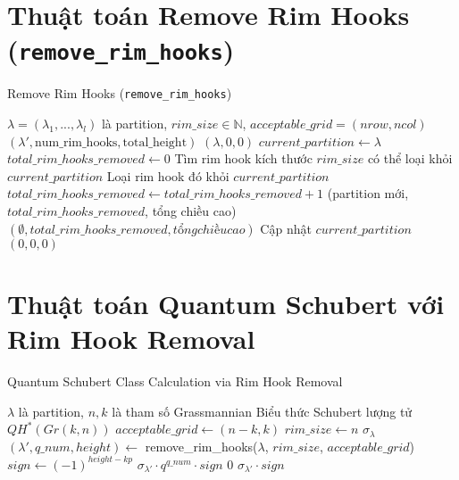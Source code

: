 \section*{Thuật toán Remove Rim Hooks (\texttt{remove\_rim\_hooks})}

\begin{algorithm}[H]
\caption{Remove Rim Hooks (\texttt{remove\_rim\_hooks})}
\begin{algorithmic}[1]
\REQUIRE $\lambda = (\lambda_1, ..., \lambda_l)$ là partition, $rim\_size \in \mathbb{N}$, $acceptable\_grid = (nrow, ncol)$
\ENSURE $(\lambda', \text{num\_rim\_hooks}, \text{total\_height})$
    \RETURN $(\lambda, 0, 0)$
\ENDIF
\STATE $current\_partition \gets \lambda$
\STATE $total\_rim\_hooks\_removed \gets 0$
    \STATE Tìm rim hook kích thước $rim\_size$ có thể loại khỏi $current\_partition$
        \STATE Loại rim hook đó khỏi $current\_partition$
        \STATE $total\_rim\_hooks\_removed \gets total\_rim\_hooks\_removed + 1$
            \RETURN (partition mới, $total\_rim\_hooks\_removed$, tổng chiều cao)
        \ENDIF
            \RETURN $(\emptyset, total\_rim\_hooks\_removed, tổng chiều cao)$
        \ENDIF
        \STATE Cập nhật $current\_partition$
    \ELSE
        \RETURN $(0, 0, 0)$
    \ENDIF
\ENDWHILE
\end{algorithmic}
\end{algorithm}

\section*{Thuật toán Quantum Schubert với Rim Hook Removal}

\begin{algorithm}[H]
\caption{Quantum Schubert Class Calculation via Rim Hook Removal}
\begin{algorithmic}[1]
\REQUIRE $\lambda$ là partition, $n, k$ là tham số Grassmannian
\ENSURE Biểu thức Schubert lượng tử $QH^*(Gr(k,n))$
\STATE $acceptable\_grid \gets (n-k, k)$
\STATE $rim\_size \gets n$
    \RETURN $\sigma_\lambda$
\ENDIF
\STATE $(\lambda', q\_num, height) \gets$ remove\_rim\_hooks($\lambda$, $rim\_size$, $acceptable\_grid$)
\STATE $sign \gets (-1)^{height-kp}$
    \RETURN $\sigma_{\lambda'} \cdot q^{q\_num} \cdot sign$
    \RETURN $0$
\ELSE
    \RETURN $\sigma_{\lambda'} \cdot sign$
\ENDIF
\end{algorithmic}
\end{algorithm}
